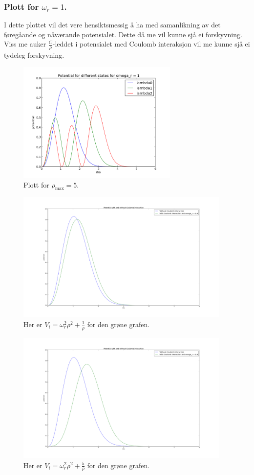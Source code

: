 \documentclass[11pt, a4paper]{article}
\begin{document}
    \subsubsection{Plott for $\omega_r = 1$.}
      I dette plottet vil det vere hensiktsmessig å ha med samanlikning av det føregåande og nåværande potensialet. Dette då me vil kunne sjå ei forskyvning. Viss me auker 
      $\frac{C}{\rho}$-leddet i potensialet med Coulomb interaksjon vil me kunne sjå ei tydeleg forskyvning.
      \begin{figure}[H]
        \centering
        \includegraphics[width=300px]{omega1.png}
        \caption{Plott for $\rho_{\text{max}} = 5$.}
      \end{figure}
      \begin{figure}[H]
        \centering
        \includegraphics[width=400px]{omega1to.png}
        \caption{Her er $V_i = \omega_r^2\rho^2 + \frac{1}{\rho}$ for den grøne grafen.}
      \end{figure}
      \begin{figure}[H]
        \centering
        \includegraphics[width=400px]{omega1to5.png}
        \caption{Her er $V_i = \omega_r^2\rho^2 + \frac{5}{\rho}$ for den grøne grafen.}
      \end{figure}
\end{document}
